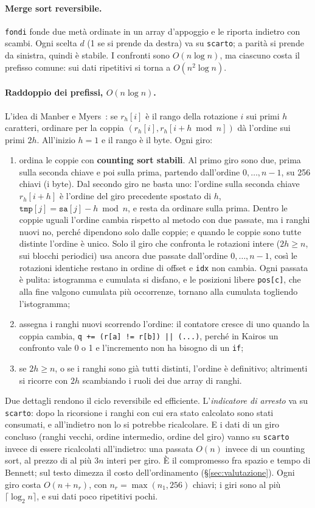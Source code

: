 \documentclass[11pt,a4paper]{article}
\newcommand{\kw}[1]{\texttt{#1}}
\begin{document}
\paragraph{Merge sort reversibile.} \kw{fondi} fonde due metà ordinate in un array d'appoggio e le riporta indietro con scambi. Ogni scelta $d$ (1 se si prende da destra) va su \kw{scarto}; a parità si prende da sinistra, quindi è stabile. I confronti sono $O(n\log n)$, ma ciascuno costa il prefisso comune: sui dati ripetitivi si torna a $O(n^2\log n)$.

\paragraph{Raddoppio dei prefissi, $O(n\log n)$.} L'idea di Manber e Myers~\cite{manber}: se $r_h[i]$ è il rango della rotazione $i$ sui primi $h$ caratteri, ordinare per la coppia $(r_h[i], r_h[i+h \bmod n])$ dà l'ordine sui primi $2h$. All'inizio $h=1$ e il rango è il byte. Ogni giro:
\begin{enumerate}
\item ordina le coppie con \textbf{counting sort stabili}. Al primo giro sono due, prima sulla seconda chiave e poi sulla prima, partendo dall'ordine $0,\dots,n-1$, su 256 chiavi (i byte). Dal secondo giro ne basta uno: l'ordine sulla seconda chiave $r_h[i+h]$ è l'ordine del giro precedente spostato di $h$, $\kw{tmp}[j] = \kw{sa}[j] - h \bmod n$, e resta da ordinare sulla prima. Dentro le coppie uguali l'ordine cambia rispetto al metodo con due passate, ma i ranghi nuovi no, perché dipendono solo dalle coppie; e quando le coppie sono tutte distinte l'ordine è unico. Solo il giro che confronta le rotazioni intere ($2h \ge n$, sui blocchi periodici) usa ancora due passate dall'ordine $0,\dots,n-1$, così le rotazioni identiche restano in ordine di offset e \kw{idx} non cambia. Ogni passata è pulita: istogramma e cumulata si disfano, e le posizioni libere \kw{pos[c]}, che alla fine valgono cumulata più occorrenze, tornano alla cumulata togliendo l'istogramma;
\item assegna i ranghi nuovi scorrendo l'ordine: il contatore cresce di uno quando la coppia cambia, \kw{q += (r[a] != r[b]) || (...)}, perché in Kairos un confronto vale 0 o 1 e l'incremento non ha bisogno di un \kw{if};
\item se $2h \ge n$, o se i ranghi sono già tutti distinti, l'ordine è definitivo; altrimenti si ricorre con $2h$ scambiando i ruoli dei due array di ranghi.
\end{enumerate}
Due dettagli rendono il ciclo reversibile ed efficiente. L'\emph{indicatore di arresto} va su \kw{scarto}: dopo la ricorsione i ranghi con cui era stato calcolato sono stati consumati, e all'indietro non lo si potrebbe ricalcolare. E i dati di un giro concluso (ranghi vecchi, ordine intermedio, ordine del giro) vanno su \kw{scarto} invece di essere ricalcolati all'indietro: una passata $O(n)$ invece di un counting sort, al prezzo di al più $3n$ interi per giro. È il compromesso fra spazio e tempo di Bennett; sul testo dimezza il costo dell'ordinamento (§\ref{sec:valutazione}). Ogni giro costa $O(n + n_r)$, con $n_r = \max(n_1, 256)$ chiavi; i giri sono al più $\lceil\log_2 n\rceil$, e sui dati poco ripetitivi pochi.
\end{document}
